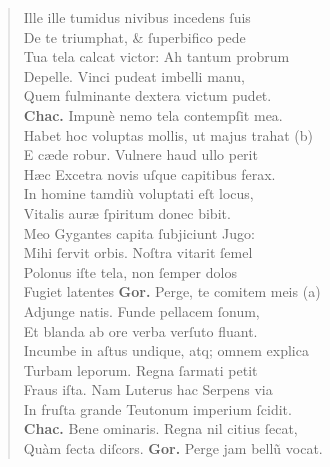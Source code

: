 \documentclass[a4paper,12pt]{article}
\begin{document}
\begin{verse}
Ille ille tumidus nivibus incedens ſuis\\[0pt]
De te triumphat, \& ſuperbifico pede\\[0pt]
Tua tela calcat victor: Ah tantum probrum\\[0pt]
Depelle. Vinci pudeat imbelli manu,\\[0pt]
Quem fulminante dextera victum pudet.\\[0pt]
\textbf{Chac.} Impunè nemo tela contempſit mea.\\[0pt]
Habet hoc voluptas mollis, ut majus trahat (b)\footnotemark\\[0pt]
E cæde robur. Vulnere haud ullo perit\\[0pt]
Hæc Excetra novis uſque capitibus ferax.\\[0pt]
In homine tamdiù voluptati eſt locus,\\[0pt]
Vitalis auræ ſpiritum donec bibit.\\[0pt]
Meo Gygantes capita ſubjiciunt Jugo:\\[0pt]
Mihi ſervit orbis. Noſtra vitarit ſemel\\[0pt]
Polonus iſte tela, non ſemper dolos\\[0pt]
Fugiet latentes \textbf{Gor.} Perge, te comitem meis (a)\footnotemark\\[0pt]
Adjunge natis. Funde pellacem ſonum,\\[0pt]
Et blanda ab ore verba verſuto fluant.\\[0pt]
Incumbe in aſtus undique, atq; omnem explica\\[0pt]
Turbam leporum. Regna ſarmati petit\\[0pt]
Fraus iſta. Nam Luterus hac Serpens via\\[0pt]
In fruſta grande Teutonum imperium ſcidit.\\[0pt]
\textbf{Chac.} Bene ominaris. Regna nil citius ſecat,\\[0pt]
Quàm ſecta diſcors. \textbf{Gor.} Perge jam bellũ vocat.\\[0pt]
\end{verse}
\end{document}
